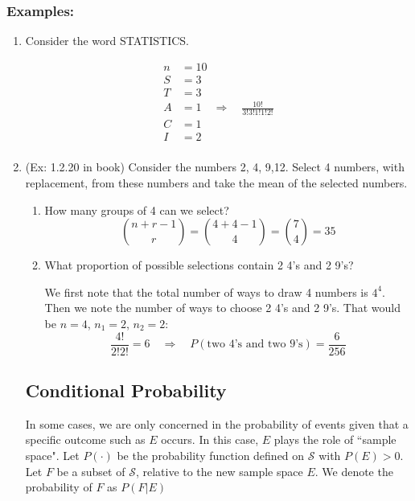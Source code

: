 \documentclass{article}
\begin{document}
\subsubsection*{Examples:}

\begin{enumerate}
    \item Consider the word STATISTICS.

\begin{equation*}
    \begin{split}
        n &= 10\\
        S &= 3 \\
        T &= 3\\
        A &= 1 \quad \Rightarrow \quad \frac{10!}{3!3!1!1!2!}\\
        C &= 1\\
        I &= 2\\
    \end{split}
\end{equation*}

    \item (Ex: 1.2.20 in book) Consider the numbers 2, 4, 9,12. Select 4 numbers, with replacement, from these numbers and take the mean of the selected numbers.

    \begin{enumerate}
        \item How many groups of 4 can we select?
        \begin{equation*}
            {n + r - 1 \choose r} = {4 + 4 - 1 \choose 4} = {7 \choose 4} = 35
        \end{equation*}
        \item What proportion of possible selections contain 2 4's and 2 9's?

        We first note that the total number of ways to draw 4 numbers is $4^4$. Then we note the number of ways to choose 2 4's and 2 9's. That would be $n=4$, $n_1 = 2$, $n_2 = 2$:
        \begin{equation*}
            \frac{4!}{2!2!} = 6 \quad \Rightarrow \quad P(\text{two 4's and two 9's}) = \frac{6}{256}
        \end{equation*}
    \end{enumerate}

    \subsection{Conditional Probability}

    In some cases, we are only concerned in the probability of events given that a specific outcome such as $E$ occurs. In this case, $E$ plays the role of ``sample space". Let $P( \cdot )$ be the probability function defined on $\mathcal{S}$ with $P(E) > 0$. Let $F$ be a subset of $\mathcal{S}$, relative to the new sample space $E$. We denote the probability of $F$ as $P(F|E)$


\end{enumerate}
\end{document}
